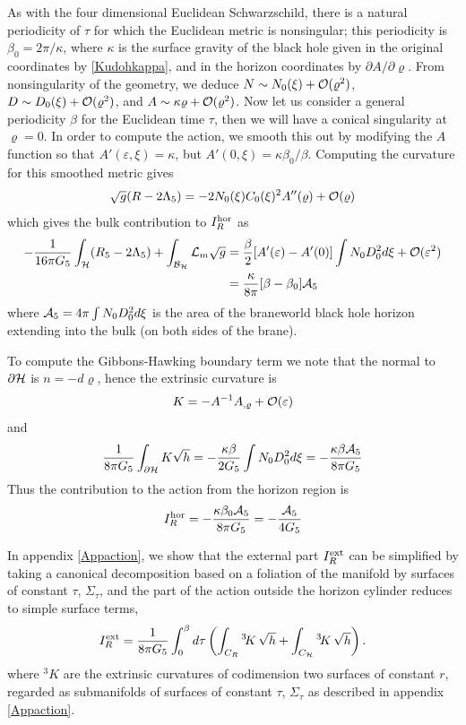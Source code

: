 \documentclass[aps,12pt,prd,superscriptaddress,preprintnumbers, 
	amssymb,
	amsmath,
	notitlepage,
	longbibliography,
	nofootinbib]{revtex4-1}
\newcommand{\be}{\begin{equation}}
\newcommand{\ee}{\end{equation}}
\newcommand{\beal}{\begin{aligned}}
\newcommand{\eeal}{\end{aligned}}
\begin{document}
As with the four dimensional Euclidean Schwarzschild, there is
a natural periodicity of $\tau$ for which the Euclidean metric
is nonsingular; this periodicity is $\beta_0=2\pi/\kappa$, where
$\kappa$ is the surface gravity of the black hole given in the original
coordinates by \eqref{Kudohkappa}, and in the horizon coordinates 
by $\partial A/\partial\varrho$. From nonsingularity of the geometry, we deduce
$N\sim N_0(\xi) + {\cal O}(\varrho^2)$, $D\sim D_0(\xi)+{\cal O}(\varrho^2)$, 
and $A \sim \kappa \varrho+ {\cal O}(\varrho^2)$. Now let us consider a
general periodicity $\beta$ for the Euclidean time $\tau$, then we will have 
a conical singularity at $\varrho=0$. In order to compute the action, we smooth
this out by modifying the $A$ function so that $A'(\varepsilon,\xi) = \kappa$,
but $A'(0,\xi) = \kappa \beta_0/\beta$. Computing the curvature for this
smoothed metric gives
\be
\sqrt{g} (R-2\Lambda_5) = - 2 N_0(\xi) C_0(\xi)^2 A'' (\varrho) + {\cal O}(\varrho)
\ee
which gives the bulk contribution to $I_R^{\rm hor}$ as
\be
\beal
-\frac{1}{16\pi G_5}\int_{\cal H}(R_5-2\Lambda_5)+
\int_{{\cal B}_{\cal H}}{\cal L}_m\sqrt{g}&=
\frac{\beta}{2} [A'(\varepsilon)-A'(0)] \int N_0D_0^2 d\xi 
+ {\cal O}(\varepsilon^2)\\
&= \frac{\kappa}{8\pi} [\beta-\beta_0] {\cal A}_5
\eeal
\ee
where $ {\cal A}_5=4\pi \int N_0D_0^2 d\xi $ is the area of the braneworld
black hole horizon extending into the bulk (on both sides of the brane).

To compute the Gibbons-Hawking boundary term we note that the normal to
${\partial \cal H}$ is $n = -d\varrho$, hence the extrinsic curvature is
\be
K=-A^{-1}A_{,\varrho}+{\cal O}(\varepsilon) 
\ee
and
\be
\frac{1}{8\pi G_5} \int_{\partial\cal H} K\sqrt{h}
= -\frac{\kappa \beta}{2G_5} \int N_0D_0^2 d\xi 
= -\frac{\kappa \beta {\cal A}_5}{8\pi G_5}
\ee
Thus the contribution to the action from the horizon region is
\be
I_R^{\rm hor}=-\frac{\kappa\beta_0 {\cal A}_5}{8\pi G_5}
= -\frac{{\cal A}_5}{4G_5}
\ee

In appendix \ref{Appaction}, we show that the external part 
$I_R^{\rm ext}$ can be simplified by taking a canonical decomposition 
based on a foliation of the manifold by surfaces of constant $\tau$, 
$\Sigma_\tau$, and the part of the action outside the horizon cylinder 
reduces to simple surface terms,
\be
I_R^{\rm ext} = \frac{1}{8\pi G_5} \int_0^\beta d\tau 
\left( \int_{C_R}  {}^3\!K\, \sqrt{h} + \int_{C_{\cal H}}  {}^3\!K\, \sqrt{h} \right).
\label{baction}
\ee
where ${}^3\!K$ are the extrinsic curvatures of codimension two
surfaces of constant $r$, regarded as submanifolds of 
surfaces of constant $\tau$, $\Sigma_\tau$ as described in appendix
\ref{Appaction}.
\end{document}
